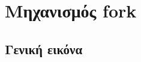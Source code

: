 \documentclass[red,slidestop,notes,compress,mathserif]{beamer}
\begin{document}

\section{Μηχανισμός fork}
\subsection{Γενική εικόνα}
\end{document}
